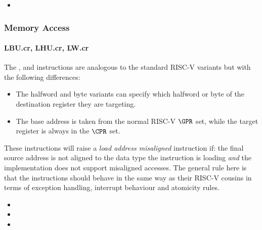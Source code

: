 \begin{itemize}
\item {}
\end{itemize}

\subsubsection{Memory Access}

\paragraph{LBU.cr, LHU.cr, LW.cr}

The ,  and  instructions are analogous to
the standard RISC-V variants but with the following differences:

\begin{itemize}
\item The halfword and byte variants can specify which halfword or byte of
      the destination register they are targeting.
\item The base address is taken from the normal RISC-V $\GPR$ set, while the
      target register is always in the $\CPR$ set.
\end{itemize}

These instructions will raise a {\em load address misaligned} instruction
if: the final source address is not aligned to the data type the instruction
is loading {\em and} the implementation does not support misaligned accesses.
The general rule here is that the  instructions should behave in
the same way as their RISC-V cousins in terms of exception handling,
interrupt behaviour and atomicity rules.

\begin{itemize}
\item {}
\item {}
\item {}
\end{itemize}

